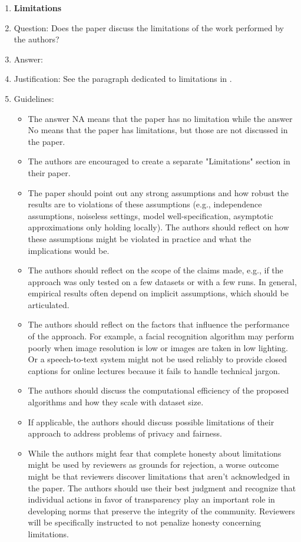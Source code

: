 \begin{enumerate}
\item {\bf Limitations}
\item[] Question: Does the paper discuss the limitations of the work performed by the authors?
\item[] Answer: \answerYes{} %
\item[] Justification: See the paragraph dedicated to limitations in .
\item[] Guidelines:
  \begin{itemize}
  \item The answer NA means that the paper has no limitation while the answer No means that the paper has limitations, but those are not discussed in the paper.
  \item The authors are encouraged to create a separate "Limitations" section in their paper.
  \item The paper should point out any strong assumptions and how robust the results are to violations of these assumptions (e.g., independence assumptions, noiseless settings, model well-specification, asymptotic approximations only holding locally). The authors should reflect on how these assumptions might be violated in practice and what the implications would be.
  \item The authors should reflect on the scope of the claims made, e.g., if the approach was only tested on a few datasets or with a few runs. In general, empirical results often depend on implicit assumptions, which should be articulated.
  \item The authors should reflect on the factors that influence the performance of the approach. For example, a facial recognition algorithm may perform poorly when image resolution is low or images are taken in low lighting. Or a speech-to-text system might not be used reliably to provide closed captions for online lectures because it fails to handle technical jargon.
  \item The authors should discuss the computational efficiency of the proposed algorithms and how they scale with dataset size.
  \item If applicable, the authors should discuss possible limitations of their approach to address problems of privacy and fairness.
  \item While the authors might fear that complete honesty about limitations might be used by reviewers as grounds for rejection, a worse outcome might be that reviewers discover limitations that aren't acknowledged in the paper. The authors should use their best judgment and recognize that individual actions in favor of transparency play an important role in developing norms that preserve the integrity of the community. Reviewers will be specifically instructed to not penalize honesty concerning limitations.
  \end{itemize}


\end{enumerate}
